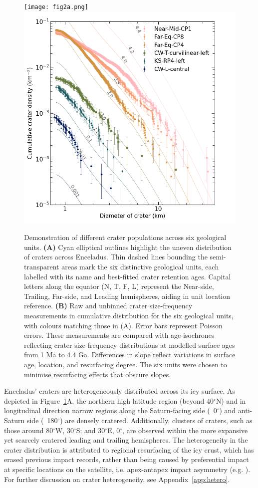 \documentclass[preprint,12pt,3p,times,authoryear]{elsarticle}
\begin{document}
\begin{figure}[ht!]
    \centering
    \texttt{[image: fig2a.png]}
    \includegraphics[width=0.5\linewidth]{fig2b.png}
    \caption{Demonstration of different crater populations across six geological units.
        \textbf{(A)} Cyan elliptical outlines highlight the uneven distribution of craters across Enceladus. Thin dashed lines bounding the semi-transparent areas mark the six distinctive geological units, each labelled with its name and best-fitted crater retention ages. Capital letters along the equator (N, T, F, L) represent the Near-side, Trailing, Far-side, and Leading hemispheres, aiding in unit location reference.
        \textbf{(B)} Raw and unbinned crater size-frequency measurements in cumulative distribution for the six geological units, with colours matching those in (A). Error bars represent Poisson errors. These measurements are compared with age-isochrones reflecting crater size-frequency distributions at modelled surface ages from 1 Ma to 4.4 Ga. Differences in slope reflect variations in surface age, location, and resurfacing degree. The six units were chosen to minimise resurfacing effects that obscure slopes. }
    \label{fig:crater}
\end{figure}

Enceladus' craters are heterogeneously distributed across its icy surface. As depicted in Figure~\ref{fig:crater}A, the northern high latitude region (beyond 40$^\circ$N) and in longitudinal direction narrow regions along the Saturn-facing side (~0$^\circ$) and anti-Saturn side (~180$^\circ$) are densely cratered. Additionally, clusters of craters, such as those around 80$^\circ$W, 30$^\circ$S; and 30$^\circ$E, 0$^\circ$, are observed within the more expansive yet scarcely cratered leading and trailing hemispheres. The heterogeneity in the crater distribution is attributed to regional resurfacing of the icy crust, which has erased previous impact records, rather than being caused by preferential impact at specific locations on the satellite, i.e. apex-antapex impact asymmetry (e.g. \citealt{Cuk2016}). For further discussion on crater heterogeneity, see Appendix~\ref{app:hetero}.\\
\end{document}
